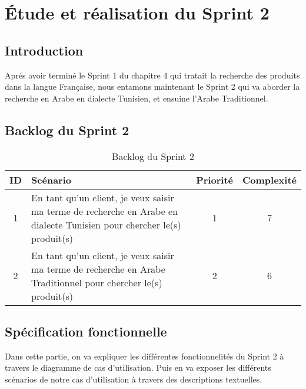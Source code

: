 \chapter{Étude et réalisation du Sprint 2}
\localtableofcontents

\newpage
\section{Introduction}
\noindent
Aprés avoir terminé le Sprint 1 du chapitre 4 qui tratait la recherche des produits dans la langue Française, nous entamons maintenant le Sprint 2 qui va aborder la recherche en Arabe en dialecte Tunisien, et ensuine l'Arabe Traditionnel.

\section{Backlog du Sprint 2}
\begin{table}[H]
	\centering

	\begin{tabularx}{\textwidth}{|c|X|c|c|}
		\hline
		\rowcolor{blue!20}
		\textbf{ID} & \textbf{Scénario}                                                                                     & \textbf{Priorité} & \textbf{Complexité} \\ \hline
		1           & En tant qu'un client, je veux saisir ma terme de recherche en Arabe en dialecte Tunisien pour chercher le(s) produit(s) & 1                 & 7                  \\ \hline

	2           & En tant qu'un client, je veux saisir ma terme de recherche en Arabe Traditionnel pour chercher le(s) produit(s) & 2                 & 6 \\ \hline
	\end{tabularx}
	\caption{Backlog du Sprint 2}
	\label{tab:sprint2}
\end{table}

\section{Spécification fonctionnelle}
\noindent
Dans cette partie, on va expliquer les différentes fonctionnelités du Sprint 2 à travers le diagramme de cas d'utilisation. Puis en va exposer les différents scénarios de notre cas d'utilisation à travers des descriptions textuelles.



